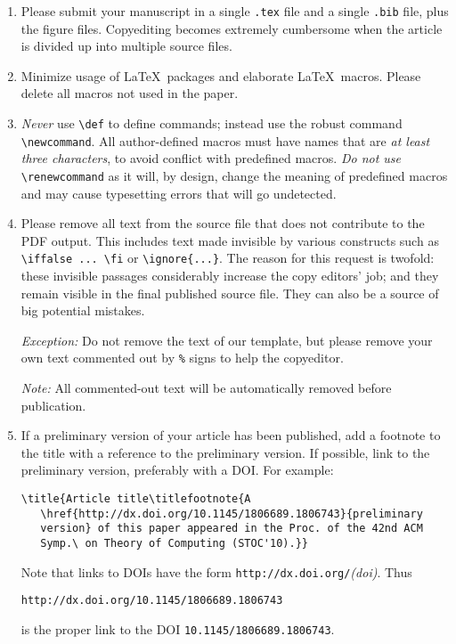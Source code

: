 \documentclass{article}
\theoremstyle{plain}
\theoremstyle{definition}
\begin{document}
\begin{enumerate}
\item Please submit your manuscript in a single \texttt{.tex} file and a
     single \texttt{.bib} file, plus the figure files.  Copyediting
     becomes extremely cumbersome when the article is divided
     up into multiple source files.
\item Minimize usage of \LaTeX\ packages and elaborate \LaTeX\
  macros.  Please delete all macros not used in the paper.
\item \emph{Never} use \lstinline.\def. to define commands; instead use the
  robust command \lstinline.\newcommand..  All author-defined
  macros must have names that are \emph{at least three characters},
  to avoid conflict with predefined macros.
  \emph{Do not use} \lstinline.\renewcommand. as it will, by design,
  change the meaning of predefined macros and may cause 
  typesetting errors that will go undetected.
\item
  Please remove all text from the source file that does not contribute
  to the PDF output.  This includes text made invisible by various
  constructs such as \lstinline'\iffalse ... \fi' or \lstinline'\ignore{...}'.
  The reason for this request is twofold: these invisible passages
  considerably increase the copy editors' job; and they remain visible
  in the final published source file.  They can also be a source of
  big potential mistakes.

  \emph{Exception:} Do not remove the text of our template,
     but please remove your own text commented out 
     by \lstinline'%' signs to help the copyeditor.

  \emph{Note:}
     All commented-out text will be automatically removed
     before publication.
\item If a preliminary version of your article has been published, add
  a footnote to the title with a reference to the preliminary
  version. If possible, link to the preliminary version, preferably
  with a DOI. For example:
\begin{lstlisting}
\title{Article title\titlefootnote{A
   \href{http://dx.doi.org/10.1145/1806689.1806743}{preliminary
   version} of this paper appeared in the Proc. of the 42nd ACM
   Symp.\ on Theory of Computing (STOC'10).}}
\end{lstlisting}
Note that links to DOIs have the form
\lstinline,http://dx.doi.org/,\textsl{(doi)}. Thus
\begin{lstlisting}
http://dx.doi.org/10.1145/1806689.1806743
\end{lstlisting}
is the proper link to the DOI
\lstinline,10.1145/1806689.1806743,.


\end{enumerate}
\end{document}
